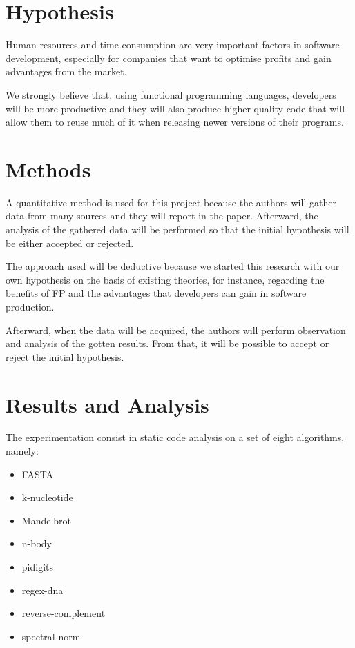 \documentclass{article}
\begin{document}
\section{Hypothesis}

Human resources and time consumption are very important factors in software development, especially for companies that want to optimise profits and gain advantages from the market. 

We strongly believe that, using functional programming languages, developers will be more productive and they will also produce higher quality code that will allow them to reuse much of it when releasing newer versions of their programs.

\section{Methods}

A quantitative method is used for this project because the authors will gather data from many sources and they will report in the paper. Afterward, the analysis of the gathered data will be performed so that the initial hypothesis will be either accepted or rejected.

The approach used will be deductive because we started this research with our own hypothesis on the basis of existing theories, for instance, regarding the benefits of FP and the advantages that developers can gain in software production.

Afterward, when the data will be acquired, the authors will perform observation and analysis of the gotten results. From that, it will be possible to accept or reject the initial hypothesis.

\section{Results and Analysis}

The experimentation consist in static code analysis on a set of eight algorithms, namely:

\begin{itemize}
\item FASTA
\item k-nucleotide
\item Mandelbrot
\item n-body
\item pidigits
\item regex-dna
\item reverse-complement
\item spectral-norm
\end{itemize}
\end{document}
